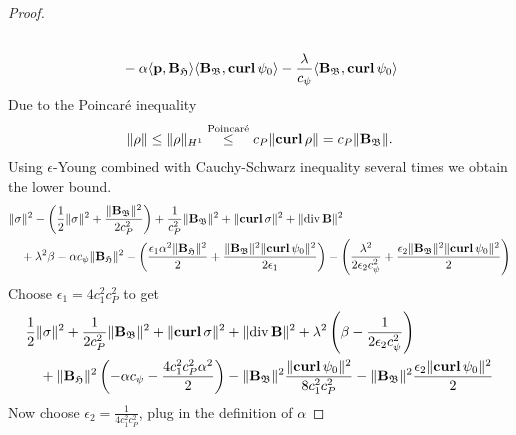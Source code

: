 \documentclass[../master_thesis.tex]{subfiles}
\begin{document}
\begin{proof}
\begin{align*}
        \\ &\quad- \alpha \langle \mathbf{p}, \mathbf{B}_\mathfrak{H} \rangle \langle \mathbf{B}_\mathfrak{B}, \veccurl \psi_0 \rangle
            - \frac{\lambda}{c_\psi} \langle \mathbf{B}_\mathfrak{B} , \veccurl \psi_0 \rangle
    \end{align*}
    Due to the Poincaré inequality
    \begin{align*}
        \lVert \rho \rVert \leq \lVert \rho \rVert _{H^1} 
        \stackrel{\text{Poincaré}}{\leq} c_P \lVert \veccurl \rho \rVert 
        = c_P \lVert \mathbf{B}_\mathfrak{B} \rVert.
    \end{align*}
    Using $\epsilon$-Young combined with Cauchy-Schwarz inequality several times 
    we obtain the lower bound.
    \begin{align*}        
        &\lVert \sigma \rVert^2 - 
            \left( \frac{1}{2} \lVert \sigma \rVert^2 
            + \frac{\lVert \mathbf{B}_\mathfrak{B} \rVert^2}{2 c_P^2}  \right)
            + \frac{1}{c_P^2} \lVert \mathbf{B}_\mathfrak{B} \rVert^2
            + \lVert  \veccurl \sigma \rVert^2 + \lVert \diver \mathbf{B} \rVert ^2
        \\ &\quad+ \lambda ^2 \beta - \alpha c_\psi \lVert \mathbf{B}_\mathfrak{H} \rVert^2
            - \left( \frac{\epsilon_1 \alpha^2 \lVert \mathbf{B}_\mathfrak{H} \rVert^2}{2} 
            + \frac{\lVert \mathbf{B}_\mathfrak{B} \rVert^2 \lVert  \veccurl \psi_0 \rVert^2}{2 \epsilon_1} \right)
            - \left( \frac{\lambda^2}{2 \epsilon_2 c_\psi^2} 
            + \frac{\epsilon_2 \lVert \mathbf{B}_\mathfrak{B} \rVert^2 \lVert  \veccurl \psi_0 \rVert^2}{2} \right)
    \end{align*}
    Choose $\epsilon_1 = 4 c_1^2 c_P^2$ to get 
    \begin{align*}
        &\frac{1}{2} \lVert \sigma \rVert^2 + \frac{1}{2 c_P^2} \lVert \mathbf{B}_\mathfrak{B} \rVert^2
        + \lVert  \veccurl \sigma \rVert^2 + \lVert \diver \mathbf{B} \rVert ^2
        + \lambda ^2 \left( \beta - \frac{1}{2 \epsilon_2 c_\psi^2} \right) 
        \\ &\quad+ \lVert \mathbf{B}_\mathfrak{H} \rVert^2 
        \left( - \alpha c_\psi - \frac{4 c_1^2 c_P^2 \alpha^2}{2} \right)
        - \lVert \mathbf{B}_\mathfrak{B} \rVert^2 \frac{\lVert  \veccurl \psi_0 \rVert^2}{8c_1^2 c_P^2}
        - \lVert \mathbf{B}_\mathfrak{B} \rVert^2 \frac{ \epsilon_2 \lVert  \veccurl \psi_0 \rVert^2 }{2}
    \end{align*}
    Now choose $\epsilon_2 = \frac{1}{4 c_1^2 c_P^2}$, plug in the definition of $\alpha$

\end{proof}
\end{document}
